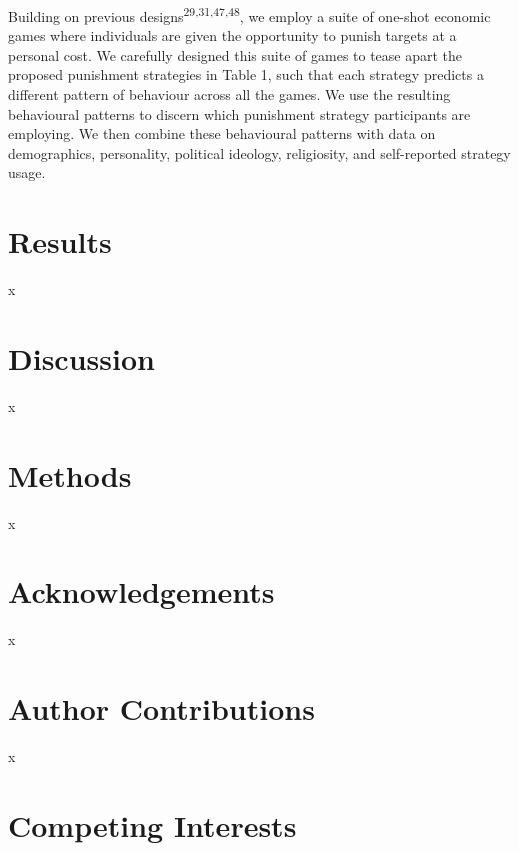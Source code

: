 \documentclass[
  man,floatsintext]{apa6}
\newenvironment{lltable}{\begin{landscape}\centering\begin{ThreePartTable}}{\end{ThreePartTable}\end{landscape}}
\begin{document}
\begin{lltable}
{\begin{longtable}{p{1.7cm}p{3.3cm}cccccccccccc}
\bottomrule
\end{longtable}

}

\end{lltable}

Building on previous designs\textsuperscript{29,31,47,48}, we employ a suite of one-shot economic games where individuals are given the opportunity to punish targets at a personal cost. We carefully designed this suite of games to tease apart the proposed punishment strategies in Table 1, such that each strategy predicts a different pattern of behaviour across all the games. We use the resulting behavioural patterns to discern which punishment strategy participants are employing. We then combine these behavioural patterns with data on demographics, personality, political ideology, religiosity, and self-reported strategy usage.

\hypertarget{results}{%
\section{Results}\label{results}}

x

\hypertarget{discussion}{%
\section{Discussion}\label{discussion}}

x

\hypertarget{methods}{%
\section{Methods}\label{methods}}

x

\newpage
\nolinenumbers

\hypertarget{acknowledgements}{%
\section{Acknowledgements}\label{acknowledgements}}

x

\hypertarget{author-contributions}{%
\section{Author Contributions}\label{author-contributions}}

x

\hypertarget{competing-interests}{%
\section{Competing Interests}\label{competing-interests}}
\end{document}
